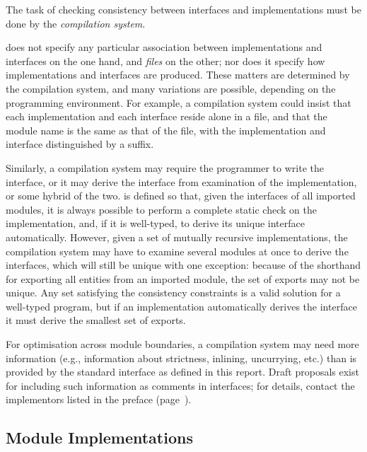 The task of checking consistency between interfaces and
implementations must be done by the {\em compilation
system}.

\Haskell{} does not specify any particular association between
implementations and interfaces on the one hand, and {\em files} on the
other; nor does it specify how implementations and interfaces are
produced.  These matters are determined by the compilation system, and
many variations are possible, depending on the programming
environment.  For example, a compilation system could insist that each
implementation and each interface reside alone in a file, and that the
module name is the same as that of the file, with the implementation
and interface distinguished by a suffix.

Similarly, a compilation system may require the programmer to write
the interface, or it may derive the interface from examination of the
implementation, or some hybrid of the two.  \Haskell{} is defined so
that, given the interfaces of all imported modules, it is always
possible to perform a complete static check on the implementation,
and, if it is well-typed, to derive its unique
interface automatically.  However, given a set of mutually recursive
implementations, the compilation system may have to examine several
modules at once to derive the interfaces, which will still be unique
with one exception: because of the shorthand for exporting all
entities from an imported module, the set of exports may not be
unique.  Any set satisfying the consistency constraints is a valid
solution for a well-typed \Haskell{} program, but if an
implementation automatically derives the interface it must derive the
smallest set of exports.

For optimisation across module boundaries, a compilation system may
need more information (e.g., information about strictness, inlining,
uncurrying, etc.) than is provided by the standard interface as
defined in this report.  Draft proposals exist for including such
information as comments in interfaces; for details, contact the
implementors listed in the preface (page~\pageref{implementors}).

\subsection{Module Implementations} 
\label{module-implementations}

